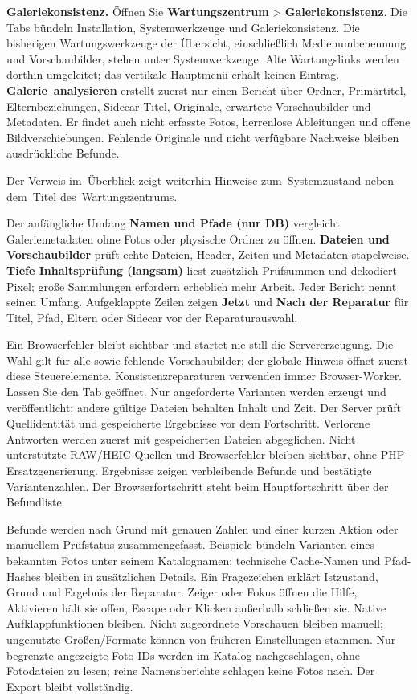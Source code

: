 \documentclass[11pt,a4paper]{article}
\newcommand{\ui}[1]{\textbf{#1}}
\begin{document}
\textbf{Galeriekonsistenz.} Öffnen Sie \ui{Wartungszentrum} >
\ui{Galeriekonsistenz}. Die Tabs bündeln Installation, Systemwerkzeuge und
Galeriekonsistenz. Die bisherigen Wartungswerkzeuge der Übersicht,
einschließlich Medienumbenennung und Vorschaubilder, stehen unter
Systemwerkzeuge. Alte Wartungslinks werden dorthin umgeleitet; das vertikale
Hauptmenü erhält keinen Eintrag. \ui{Galerie~analysieren} erstellt zuerst nur
einen Bericht über Ordner, Primärtitel, Elternbeziehungen, Sidecar-Titel,
Originale, erwartete Vorschaubilder und Metadaten. Er findet auch nicht
erfasste Fotos, herrenlose Ableitungen und offene Bildverschiebungen. Fehlende
Originale und nicht verfügbare Nachweise bleiben ausdrückliche Befunde.

Der Verweis im~Überblick zeigt weiterhin Hinweise zum~Systemzustand neben
dem~Titel des~Wartungszentrums.

Der anfängliche Umfang \ui{Namen und Pfade (nur DB)} vergleicht
Galeriemetadaten ohne Fotos oder physische Ordner zu öffnen. \ui{Dateien und
Vorschaubilder} prüft echte Dateien, Header, Zeiten und Metadaten stapelweise.
\ui{Tiefe Inhaltsprüfung (langsam)} liest zusätzlich Prüfsummen und dekodiert
Pixel; große Sammlungen erfordern erheblich mehr Arbeit. Jeder Bericht nennt
seinen Umfang. Aufgeklappte Zeilen zeigen \ui{Jetzt} und \ui{Nach der
Reparatur} für Titel, Pfad, Eltern oder Sidecar vor der Reparaturauswahl.

Ein Browserfehler bleibt sichtbar und startet nie still die Servererzeugung.
Die Wahl gilt für alle sowie fehlende Vorschaubilder; der globale Hinweis
öffnet zuerst diese Steuerelemente. Konsistenzreparaturen verwenden immer
Browser-Worker. Lassen Sie den Tab geöffnet. Nur angeforderte Varianten werden
erzeugt und veröffentlicht; andere gültige Dateien behalten Inhalt und Zeit.
Der Server prüft Quellidentität und gespeicherte Ergebnisse vor dem Fortschritt.
Verlorene Antworten werden zuerst mit gespeicherten Dateien abgeglichen.
Nicht unterstützte RAW/HEIC-Quellen und Browserfehler bleiben sichtbar, ohne
PHP-Ersatzgenerierung. Ergebnisse zeigen verbleibende Befunde und bestätigte
Variantenzahlen.
Der Browserfortschritt steht beim Hauptfortschritt über der Befundliste.

Befunde werden nach Grund mit genauen Zahlen und einer kurzen Aktion oder
manuellem Prüfstatus zusammengefasst. Beispiele bündeln Varianten eines bekannten
Fotos unter seinem Katalognamen; technische Cache-Namen und Pfad-Hashes bleiben
in zusätzlichen Details. Ein Fragezeichen erklärt Istzustand, Grund und Ergebnis
der Reparatur. Zeiger oder Fokus öffnen die Hilfe, Aktivieren hält sie offen,
Escape oder Klicken außerhalb schließen sie. Native Aufklappfunktionen bleiben.
Nicht zugeordnete Vorschauen bleiben manuell; ungenutzte Größen/Formate können
von früheren Einstellungen stammen. Nur begrenzte angezeigte Foto-IDs werden im
Katalog nachgeschlagen, ohne Fotodateien zu lesen; reine Namensberichte schlagen
keine Fotos nach. Der Export bleibt vollständig.
\end{document}
